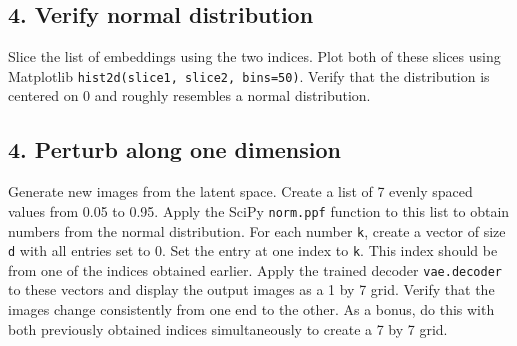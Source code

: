 \documentclass{article}
\begin{document}
\subsection*{4. Verify normal distribution}
Slice the list of embeddings using the two indices. Plot both of these slices using Matplotlib \texttt{hist2d(slice1, slice2, bins=50)}. Verify that the distribution is centered on 0 and roughly resembles a normal distribution.

\subsection*{4. Perturb along one dimension}
Generate new images from the latent space. Create a list of 7 evenly spaced values from 0.05 to 0.95. Apply the SciPy \texttt{norm.ppf} function to this list to obtain numbers from the normal distribution. For each number \texttt{k}, create a vector of size \texttt{d} with all entries set to 0. Set the entry at one index to \texttt{k}. This index should be from one of the indices obtained earlier. Apply the trained decoder \texttt{vae.decoder} to these vectors and display the output images as a 1 by 7 grid. Verify that the images change consistently from one end to the other. As a bonus, do this with both previously obtained indices simultaneously to create a 7 by 7 grid.
\end{document}
